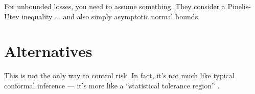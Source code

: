 \documentclass[twoside,11pt]{article}
\numberwithin{equation}{section}
\begin{document}
For unbounded losses, you need to assume something.  They consider
a Pinelis-Utev inequality ... and also simply asymptotic normal bounds.







\section{Alternatives}

This is not the only way to control risk.  In fact, it's not much like typical
conformal inference --- it's more like a ``statistical tolerance region''
\citep{krishnamoorthy:2009:toleranceregions}.





\newpage

\printbibliography{}
\end{document}
